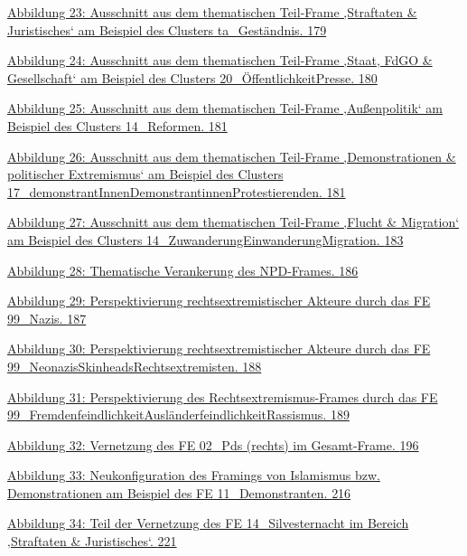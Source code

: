 \hyperref[_Ref162439822]{Abbildung 23: Ausschnitt aus dem thematischen Teil-Frame ‚Straftaten \& Juristisches` am Beispiel des Clusters ta\_Geständnis. \hyperref[_Ref162439822]{179}}

\hyperref[_Ref162439808]{Abbildung 24: Ausschnitt aus dem thematischen Teil-Frame ‚Staat, FdGO \& Gesellschaft` am Beispiel des Clusters 20\_Öffentlichkeit{\breakbar}Presse. \hyperref[_Ref162439808]{180}}

\hyperref[_Ref162439766]{Abbildung 25: Ausschnitt aus dem thematischen Teil-Frame ‚Außenpolitik` am Beispiel des Clusters 14\_Reformen. \hyperref[_Ref162439766]{181}}

\hyperref[_Ref162439793]{Abbildung 26: Ausschnitt aus dem thematischen Teil-Frame ‚Demonstrationen \& politischer Extremismus` am Beispiel des Clusters 17\_demonstrantInnen{\breakbar}Demonstrantinnen{\breakbar}Protestierenden. \hyperref[_Ref162439793]{181}}

\hyperref[_Ref162439728]{Abbildung 27: Ausschnitt aus dem thematischen Teil-Frame ‚Flucht \& Migration` am Beispiel des Clusters 14\_Zuwanderung{\breakbar}Einwanderung{\breakbar}Migration. \hyperref[_Ref162439728]{183}}

\hyperref[_Ref162450642]{Abbildung 28: Thematische Verankerung des NPD-Frames. \hyperref[_Ref162450642]{186}}

\hyperref[_Ref162450557]{Abbildung 29: Perspektivierung rechtsextremistischer Akteure durch das FE 99\_Nazis. \hyperref[_Ref162450557]{187}}

\hyperref[_Ref162450533]{Abbildung 30: Perspektivierung rechtsextremistischer Akteure durch das FE 99\_Neonazis{\breakbar}Skinheads{\breakbar}Rechtsextremisten. \hyperref[_Ref162450533]{188}}

\hyperref[_Ref162450504]{Abbildung 31: Perspektivierung des Rechtsextremismus-Frames durch das FE 99\_Fremdenfeindlichkeit{\breakbar}Ausländerfeindlichkeit{\breakbar}Rassismus. \hyperref[_Ref162450504]{189}}

\hyperref[_Ref162441675]{Abbildung 32: Vernetzung des FE 02\_Pds (rechts) im Gesamt-Frame. \hyperref[_Ref162441675]{196}}

\hyperref[_Ref162442308]{Abbildung 33: Neukonfiguration des Framings von Islamismus bzw. Demonstrationen am Beispiel des FE 11\_Demonstranten. \hyperref[_Ref162442308]{216}}

\hyperref[_Ref162457718]{Abbildung 34: Teil der Vernetzung des FE 14\_Silvesternacht im Bereich ‚Straftaten \& Juristisches`. \hyperref[_Ref162457718]{221}}

